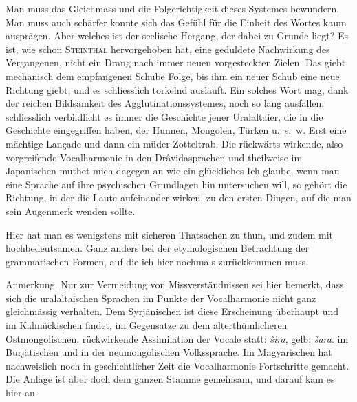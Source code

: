 Man muss das Gleichmass und die Folgerichtigkeit dieses Systemes bewundern. Man muss auch  schärfer konnte sich das Gefühl für die Einheit des Wortes kaum ausprägen. Aber welches ist der seelische Hergang, der dabei zu Grunde liegt? Es ist, wie schon \textsc{Steinthal} hervorgehoben hat, eine geduldete Nachwirkung des Vergangenen, nicht ein Drang nach immer neuen vorgesteckten Zielen. Das giebt \label{fp.383} mechanisch dem empfangenen Schube Folge, bis ihm ein neuer Schub eine neue Richtung giebt, und es schliesslich torkelnd ausläuft. Ein solches Wort mag, dank der reichen Bildsamkeit des Agglutinationssystemes, noch so lang ausfallen: schliesslich verbildlicht es immer die Geschichte jener Uralaltaier, die in die Geschichte eingegriffen haben, der Hunnen, Mongolen, Türken u.~s.~w. Erst eine mächtige Lançade und dann ein müder Zotteltrab. Die rückwärts wirkende, also vorgreifende Vocalharmonie in den Drâvidasprachen und theilweise im Japanischen muthet mich dagegen an wie ein glückliches   Ich glaube, wenn man eine Sprache auf ihre psychischen Grundlagen hin untersuchen will, so gehört die Richtung, in der die Laute aufeinander wirken, zu den ersten Dingen, auf die man sein Augenmerk wenden sollte.

\label{sp.403}

Hier hat man es wenigstens mit sicheren Thatsachen zu thun, und zudem mit hochbedeutsamen. Ganz anders bei der etymologischen Betrachtung der grammatischen Formen, auf die ich hier nochmals zurückkommen muss.

\begin{styleAnmerk}
Anmerkung. Nur zur Vermeidung von Missverständnissen sei hier bemerkt, dass sich die ural\-altaischen Sprachen im Punkte der Vocalharmonie nicht ganz gleichmässig verhalten. Dem Syrjänischen ist diese Erscheinung überhaupt   und im Kalmückischen findet, im Gegensatze zu dem alterthümlicheren Ostmongolischen, rückwirkende Assimilation der Vocale statt: \textit{šira}, gelb: \textit{šara}.  im Burjätischen und in der neumongolischen Volkssprache. Im Magyarischen hat nachweislich noch in geschichtlicher Zeit die Vocalharmonie Fortschritte gemacht. Die Anlage ist aber doch dem ganzen Stamme gemeinsam, und darauf kam es hier an.
\end{styleAnmerk}

